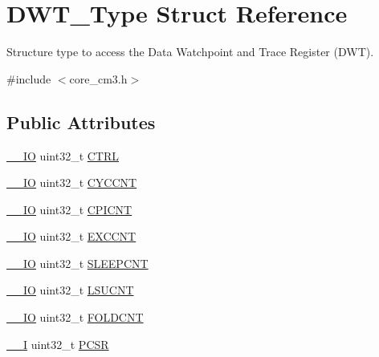 \hypertarget{struct_d_w_t___type}{}\section{D\+W\+T\+\_\+\+Type Struct Reference}
\label{struct_d_w_t___type}


Structure type to access the Data Watchpoint and Trace Register (D\+WT).  




{\ttfamily \#include $<$core\+\_\+cm3.\+h$>$}

\subsection*{Public Attributes}
\begin{DoxyCompactItemize}
\item 
\hyperlink{core__sc300_8h_aec43007d9998a0a0e01faede4133d6be}{\+\_\+\+\_\+\+IO} uint32\+\_\+t \hyperlink{struct_d_w_t___type_a37964d64a58551b69ce4c8097210d37d}{C\+T\+RL}
\item 
\hyperlink{core__sc300_8h_aec43007d9998a0a0e01faede4133d6be}{\+\_\+\+\_\+\+IO} uint32\+\_\+t \hyperlink{struct_d_w_t___type_a71680298e85e96e57002f87e7ab78fd4}{C\+Y\+C\+C\+NT}
\item 
\hyperlink{core__sc300_8h_aec43007d9998a0a0e01faede4133d6be}{\+\_\+\+\_\+\+IO} uint32\+\_\+t \hyperlink{struct_d_w_t___type_a88cca2ab8eb1b5b507817656ceed89fc}{C\+P\+I\+C\+NT}
\item 
\hyperlink{core__sc300_8h_aec43007d9998a0a0e01faede4133d6be}{\+\_\+\+\_\+\+IO} uint32\+\_\+t \hyperlink{struct_d_w_t___type_ac0801a2328f3431e4706fed91c828f82}{E\+X\+C\+C\+NT}
\item 
\hyperlink{core__sc300_8h_aec43007d9998a0a0e01faede4133d6be}{\+\_\+\+\_\+\+IO} uint32\+\_\+t \hyperlink{struct_d_w_t___type_a8afd5a4bf994011748bc012fa442c74d}{S\+L\+E\+E\+P\+C\+NT}
\item 
\hyperlink{core__sc300_8h_aec43007d9998a0a0e01faede4133d6be}{\+\_\+\+\_\+\+IO} uint32\+\_\+t \hyperlink{struct_d_w_t___type_aeba92e6c7fd3de4ba06bfd94f47f5b35}{L\+S\+U\+C\+NT}
\item 
\hyperlink{core__sc300_8h_aec43007d9998a0a0e01faede4133d6be}{\+\_\+\+\_\+\+IO} uint32\+\_\+t \hyperlink{struct_d_w_t___type_a35f2315f870a574e3e6958face6584ab}{F\+O\+L\+D\+C\+NT}
\item 
\hyperlink{core__sc300_8h_af63697ed9952cc71e1225efe205f6cd3}{\+\_\+\+\_\+I} uint32\+\_\+t \hyperlink{struct_d_w_t___type_abc5ae11d98da0ad5531a5e979a3c2ab5}{P\+C\+SR}

\end{DoxyCompactItemize}

